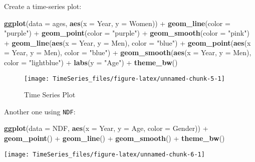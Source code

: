 \documentclass[]{article}
\newenvironment{Shaded}{\begin{snugshade}}{\end{snugshade}}
\newcommand{\KeywordTok}[1]{\textcolor[rgb]{0.13,0.29,0.53}{\textbf{{#1}}}}
\newcommand{\DataTypeTok}[1]{\textcolor[rgb]{0.13,0.29,0.53}{{#1}}}
\newcommand{\StringTok}[1]{\textcolor[rgb]{0.31,0.60,0.02}{{#1}}}
\newcommand{\NormalTok}[1]{{#1}}
\begin{document}
Create a time-series plot:

\begin{Shaded}
\begin{Highlighting}[]
\KeywordTok{ggplot}\NormalTok{(}\DataTypeTok{data =} \NormalTok{ages, }\KeywordTok{aes}\NormalTok{(}\DataTypeTok{x =} \NormalTok{Year, }\DataTypeTok{y =} \NormalTok{Women)) +}\StringTok{ }
\StringTok{  }\KeywordTok{geom_line}\NormalTok{(}\DataTypeTok{color =} \StringTok{"purple"}\NormalTok{) +}\StringTok{ }
\StringTok{  }\KeywordTok{geom_point}\NormalTok{(}\DataTypeTok{color =} \StringTok{"purple"}\NormalTok{) +}\StringTok{ }
\StringTok{  }\KeywordTok{geom_smooth}\NormalTok{(}\DataTypeTok{color =} \StringTok{"pink"}\NormalTok{) +}\StringTok{ }
\StringTok{  }\KeywordTok{geom_line}\NormalTok{(}\KeywordTok{aes}\NormalTok{(}\DataTypeTok{x =} \NormalTok{Year, }\DataTypeTok{y =} \NormalTok{Men), }\DataTypeTok{color =} \StringTok{"blue"}\NormalTok{) +}\StringTok{ }
\StringTok{  }\KeywordTok{geom_point}\NormalTok{(}\KeywordTok{aes}\NormalTok{(}\DataTypeTok{x =} \NormalTok{Year, }\DataTypeTok{y =} \NormalTok{Men), }\DataTypeTok{color =} \StringTok{"blue"}\NormalTok{) +}\StringTok{ }
\StringTok{  }\KeywordTok{geom_smooth}\NormalTok{(}\KeywordTok{aes}\NormalTok{(}\DataTypeTok{x =} \NormalTok{Year, }\DataTypeTok{y =} \NormalTok{Men), }\DataTypeTok{color =} \StringTok{"lightblue"}\NormalTok{) +}
\StringTok{  }\KeywordTok{labs}\NormalTok{(}\DataTypeTok{y =} \StringTok{"Age"}\NormalTok{) +}
\StringTok{  }\KeywordTok{theme_bw}\NormalTok{()}
\end{Highlighting}
\end{Shaded}

\begin{figure}

{\centering \texttt{[image: TimeSeries\_files/figure-latex/unnamed-chunk-5-1]} 

}

\caption{Time Series Plot}\label{fig:unnamed-chunk-5}
\end{figure}

Another one using \texttt{NDF}:

\begin{Shaded}
\begin{Highlighting}[]
\KeywordTok{ggplot}\NormalTok{(}\DataTypeTok{data =} \NormalTok{NDF, }\KeywordTok{aes}\NormalTok{(}\DataTypeTok{x =} \NormalTok{Year, }\DataTypeTok{y =} \NormalTok{Age, }\DataTypeTok{color =} \NormalTok{Gender)) +}\StringTok{ }
\StringTok{  }\KeywordTok{geom_point}\NormalTok{() +}\StringTok{ }
\StringTok{  }\KeywordTok{geom_line}\NormalTok{() +}
\StringTok{  }\KeywordTok{geom_smooth}\NormalTok{() +}
\StringTok{  }\KeywordTok{theme_bw}\NormalTok{() }
\end{Highlighting}
\end{Shaded}

\begin{center}\texttt{[image: TimeSeries\_files/figure-latex/unnamed-chunk-6-1]} \end{center}
\end{document}
